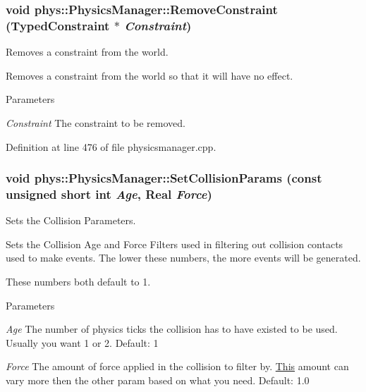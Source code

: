 \hypertarget{classphys_1_1PhysicsManager_ace94aa20b5191b01630e7a5046cb7af6}{
\subsubsection[{RemoveConstraint}]{\setlength{\rightskip}{0pt plus 5cm}void phys::PhysicsManager::RemoveConstraint ({\bf TypedConstraint} $\ast$ {\em Constraint})}}
\label{d3/dcc/classphys_1_1PhysicsManager_ace94aa20b5191b01630e7a5046cb7af6}


Removes a constraint from the world. 

Removes a constraint from the world so that it will have no effect. 
\begin{DoxyParams}{Parameters}
\item[{\em Constraint}]The constraint to be removed. \end{DoxyParams}


Definition at line 476 of file physicsmanager.cpp.

\hypertarget{classphys_1_1PhysicsManager_a98ee9704eec230ff759850ffa8394489}{
\subsubsection[{SetCollisionParams}]{\setlength{\rightskip}{0pt plus 5cm}void phys::PhysicsManager::SetCollisionParams (const unsigned short int {\em Age}, \/  {\bf Real} {\em Force})}}
\label{d3/dcc/classphys_1_1PhysicsManager_a98ee9704eec230ff759850ffa8394489}


Sets the Collision Parameters. 

Sets the Collision Age and Force Filters used in filtering out collision contacts used to make events. The lower these numbers, the more events will be generated. \par
 These numbers both default to 1. 
\begin{DoxyParams}{Parameters}
\item[{\em Age}]The number of physics ticks the collision has to have existed to be used. Usually you want 1 or 2. Default: 1 \item[{\em Force}]The amount of force applied in the collision to filter by. \hyperlink{structThis}{This} amount can vary more then the other param based on what you need. Default: 1.0 \end{DoxyParams}


